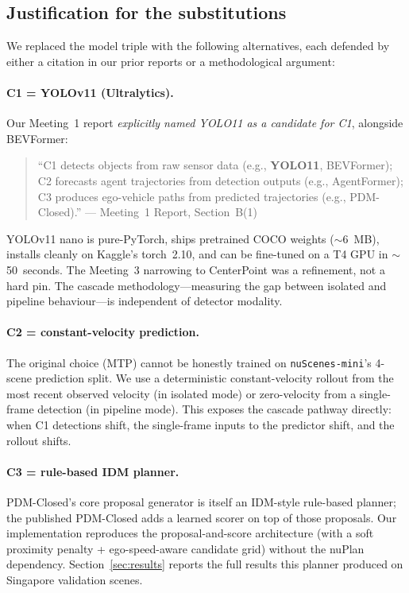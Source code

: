 \documentclass[11pt,a4paper]{article}
\begin{document}
\subsection{Justification for the substitutions}
\label{sec:model_choice}

We replaced the model triple with the following alternatives, each
defended by either a citation in our prior reports or a methodological
argument:

\paragraph{C1 = YOLOv11 (Ultralytics).} Our Meeting~1 report
\textit{explicitly named YOLO11 as a candidate for C1}, alongside
BEVFormer:

\begin{quote}
\small ``C1 detects objects from raw sensor data (e.g.,
\textbf{YOLO11}, BEVFormer); C2 forecasts agent trajectories from
detection outputs (e.g., AgentFormer); C3 produces ego-vehicle paths
from predicted trajectories (e.g., PDM-Closed).''
\hfill --- Meeting~1 Report, Section~B(1)
\end{quote}

YOLOv11 nano is pure-PyTorch, ships pretrained COCO weights ($\sim$6~MB),
installs cleanly on Kaggle's torch~2.10, and can be fine-tuned on a
T4 GPU in $\sim$50~seconds. The Meeting~3 narrowing to CenterPoint
was a refinement, not a hard pin. The cascade methodology---measuring
the gap between isolated and pipeline behaviour---is independent of
detector modality.

\paragraph{C2 = constant-velocity prediction.} The original choice
(MTP) cannot be honestly trained on \texttt{nuScenes-mini}'s 4-scene
prediction split. We use a deterministic constant-velocity rollout
from the most recent observed velocity (in isolated mode) or
zero-velocity from a single-frame detection (in pipeline mode). This
exposes the cascade pathway directly: when C1 detections shift, the
single-frame inputs to the predictor shift, and the rollout shifts.

\paragraph{C3 = rule-based IDM planner.} PDM-Closed's core proposal
generator is itself an IDM-style rule-based planner; the published
PDM-Closed adds a learned scorer on top of those proposals. Our
implementation reproduces the proposal-and-score architecture (with a
soft proximity penalty + ego-speed-aware candidate grid) without the
nuPlan dependency. Section~\ref{sec:results} reports the full results
this planner produced on Singapore validation scenes.
\end{document}
